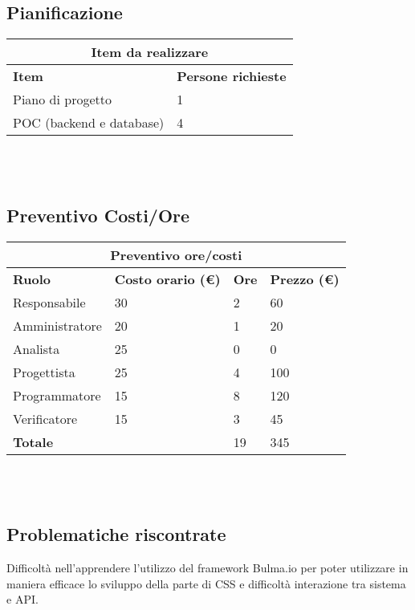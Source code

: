 \documentclass[12pt]{article}
\begin{document}
\subsection{Pianificazione}
\begin{center}
    \begin{tabularx}{\textwidth}{|X|X|}
        \hline
        \multicolumn{2}{|c|}{\textbf{Item da realizzare}}\\
        \hline
        \hline
        \textbf{Item} & \textbf{Persone richieste}\\
        \hline
        Piano di progetto & 1\\
        \hline
        POC (backend e database) & 4 \\
        \hline
    \end{tabularx}\\[8pt]
    \mbox{}\\
\end{center}
\subsection{Preventivo Costi/Ore}
\begin{center}
    \begin{tabularx}{\textwidth}{|X|X|X|X|}
        \hline
        \multicolumn{4}{|c|}{\textbf{Preventivo ore/costi}}\\
        \hline
        \hline
        \textbf{Ruolo} & \textbf{Costo orario (\euro)} & \textbf{Ore} & \textbf{Prezzo (\euro)}\\
        \hline
        Responsabile    & 30 & 2 & 60\\   
        \hline
        Amministratore  & 20 & 1  & 20\\ 
        \hline
        Analista        & 25 & 0  & 0\\ 
        \hline
        Progettista     & 25 & 4  & 100\\
        \hline
        Programmatore   & 15 & 8  & 120\\
        \hline
        Verificatore    & 15 & 3  & 45\\
        \hline  
        \textbf{Totale} &    & 19 & 345\\
        \hline
    \end{tabularx}\\[8pt]
    \mbox{}\\
\end{center}
\subsection{Problematiche riscontrate}
Difficoltà nell’apprendere l’utilizzo del framework Bulma.io per poter utilizzare in maniera efficace lo sviluppo della parte di CSS e difficoltà interazione tra sistema e API. 
\end{document}
